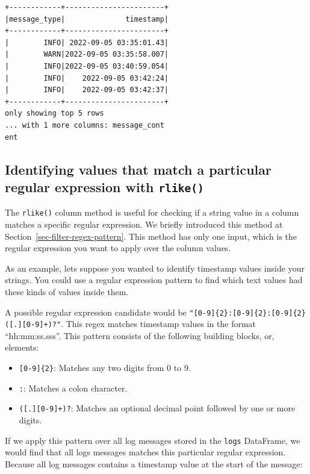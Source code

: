 \documentclass[
  11pt,
  letterpaper,
  DIV=11,
  numbers=noendperiod]{scrreprt}
\providecommand{\tightlist}{%
  \setlength{\itemsep}{0pt}\setlength{\parskip}{0pt}}\usepackage{longtable,booktabs,array}
\begin{document}
\begin{verbatim}
+------------+-----------------------+
|message_type|              timestamp|
+------------+-----------------------+
|        INFO| 2022-09-05 03:35:01.43|
|        WARN|2022-09-05 03:35:58.007|
|        INFO|2022-09-05 03:40:59.054|
|        INFO|    2022-09-05 03:42:24|
|        INFO|    2022-09-05 03:42:37|
+------------+-----------------------+
only showing top 5 rows
... with 1 more columns: message_cont
ent
\end{verbatim}

\subsection{\texorpdfstring{Identifying values that match a particular
regular expression with
\texttt{rlike()}}{Identifying values that match a particular regular expression with rlike()}}\label{identifying-values-that-match-a-particular-regular-expression-with-rlike}

The \texttt{rlike()} column method is useful for checking if a string
value in a column matches a specific regular expression. We briefly
introduced this method at Section~\ref{sec-filter-regex-pattern}. This
method has only one input, which is the regular expression you want to
apply over the column values.

As an example, lets suppose you wanted to identify timestamp values
inside your strings. You could use a regular expression pattern to find
which text values had these kinds of values inside them.

A possible regular expression candidate would be
\texttt{"{[}0-9{]}\{2\}:{[}0-9{]}\{2\}:{[}0-9{]}\{2\}({[}.{]}{[}0-9{]}+)?"}.
This regex matches timestamp values in the format ``hh:mm:ss.sss''. This
pattern consists of the following building blocks, or, elements:

\begin{itemize}
\tightlist
\item
  \texttt{{[}0-9{]}\{2\}}: Matches any two digits from 0 to 9.
\item
  \texttt{:}: Matches a colon character.
\item
  \texttt{({[}.{]}{[}0-9{]}+)?}: Matches an optional decimal point
  followed by one or more digits.
\end{itemize}

If we apply this pattern over all log messages stored in the
\texttt{logs} DataFrame, we would find that all logs messages matches
this particular regular expression. Because all log messages contains a
timestamp value at the start of the message:
\end{document}
